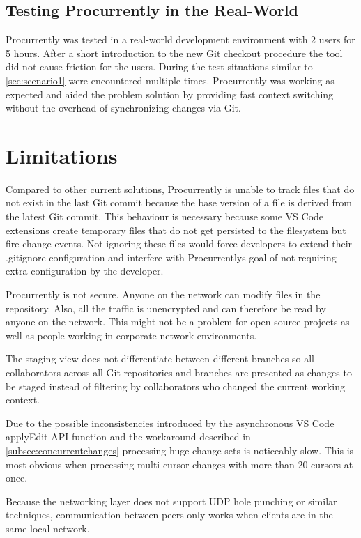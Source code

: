 \subsection{Testing Procurrently in the Real-World}

Procurrently was tested in a real-world development environment with 2 users for 5 hours. After a short introduction to the new Git checkout procedure the tool did not cause friction for the users. During the test situations similar to \autoref{sec:scenario1} were encountered multiple times. Procurrently was working as expected and aided the problem solution by providing fast context switching without the overhead of synchronizing changes via Git.

\section{Limitations}

Compared to other current solutions, Procurrently is unable to track files that do not exist in the last Git commit because the base version of a file is derived from the latest Git commit. This behaviour is necessary because some VS Code extensions create temporary files that do not get persisted to the filesystem but fire change events. Not ignoring these files would force developers to extend their .gitignore configuration and interfere with Procurrentlys goal of not requiring extra configuration by the developer.

Procurrently is not secure. Anyone on the network can modify files in the repository. Also, all the traffic is unencrypted and can therefore be read by anyone on the network. This might not be a problem for open source projects as well as people working in corporate network environments.

The staging view does not differentiate between different branches so all collaborators across all Git repositories and branches are presented as changes to be staged instead of filtering by collaborators who changed the current working context.

Due to the possible inconsistencies introduced by the asynchronous VS Code applyEdit API function and the workaround described in \autoref{subsec:concurrentchanges} processing huge change sets is noticeably slow. This is most obvious when processing multi cursor changes with more than 20 cursors at once.

Because the networking layer does not support UDP hole punching \cite{10.1007/978-3-642-20798-3_1} or similar techniques, communication between peers only works when clients are in the same local network.

